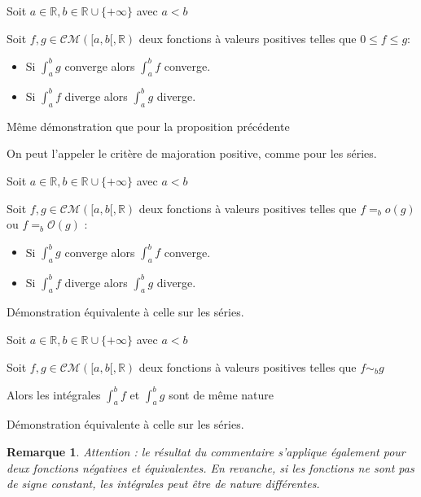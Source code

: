 \documentclass[a4paper,12pt]{book}
\newcommand{\Prop}[2]{\begin{tcolorbox}[sharp corners, colback=white,colframe=red!90!black!75, title=Proposition : #1]#2\end{tcolorbox}}
\newcommand{\Pre}[1]{\begin{tcolorbox}[sharp corners, colback=white,colframe=green!60!green!30!black!75, title=Preuve]#1\end{tcolorbox}}
\newtheorem{Rem}{Remarque}[section]
\def\R{\mathbb{R}}
\begin{document}
\Prop{}{Soit $a\in\R, b\in\R\cup\{+\infty\}$ avec $a<b$ \par Soit $f,g\in\mathcal{CM}([a,b[,\R)$ deux fonctions à valeurs positives telles que $0\leq f\leq g$:\begin{itemize}
\item Si $\int_a^bg$ converge alors $\int_a^bf$ converge.
\item Si $\int_a^bf$ diverge alors $\int_a^bg$ diverge. \end{itemize}}
\Pre{Même démonstration que pour la proposition précédente}
On peut l'appeler le critère de majoration positive, comme pour les séries.
\Prop{Corollaire}{Soit $a\in\R, b\in\R\cup\{+\infty\}$ avec $a<b$ \par Soit $f,g\in\mathcal{CM}([a,b[,\R)$ deux fonctions à valeurs positives telles que $f=_bo(g)$ ou $f=_b\mathcal{O}(g)$ :\begin{itemize}
\item Si $\int_a^bg$ converge alors $\int_a^bf$ converge.
\item Si $\int_a^bf$ diverge alors $\int_a^bg$ diverge.\end{itemize}}
\Pre{Démonstration équivalente à celle sur les séries.}
\Prop{Corollaire}{Soit $a\in\R, b\in\R\cup\{+\infty\}$ avec $a<b$ \par Soit $f,g\in\mathcal{CM}([a,b[,\R)$ deux fonctions à valeurs positives telles que $f\sim_b g$ \par Alors les intégrales $\int_a^bf$ et $\int_a^bg$ sont de même nature}
\Pre{Démonstration équivalente à celle sur les séries.}
\begin{Rem}
Attention : le résultat du commentaire s'applique également pour deux fonctions négatives et équivalentes. En revanche, si les fonctions ne sont pas de signe constant, les intégrales peut être de nature différentes.
\end{Rem}
\end{document}
